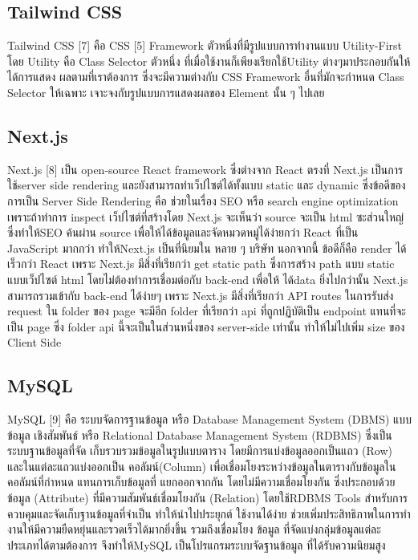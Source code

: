 \subsection{Tailwind CSS}

Tailwind CSS [7] คือ CSS [5] Framework ตัวหนึ่งที่มีรูปแบบการทํางานแบบ Utility-First โดย
Utility คือ Class Selector ตัวหนึ่ง ที่เมื่อใช้งานก็เพียงเรียกใช้Utility ต่างๆมาประกอบกันให้ได้การแสดง
ผลตามที่เราต้องการ ซึ่งจะมีความต่างกับ CSS Framework อื่นที่มักจะกําหนด Class Selector ให้เฉพาะ
เจาะจงกับรูปแบบการแสดงผลของ Element นั้น ๆ ไปเลย
\subsection{Next.js}

Next.js [8] เป็น open-source React framework ซึ่งต่างจาก React ตรงที่ Next.js เป็นการใช้server
side rendering และยังสามารถทําเว็ปไซต์ได้ทั้งแบบ static และ dynamic ซึ่งข้อดีของการเป็น Server
Side Rendering คือ ช่วยในเรื่อง SEO หรือ search engine optimization เพราะถ้าทําการ inspect
เว็ปไซต์ที่สร้างโดย Next.js จะเห็นว่า source จะเป็น html ซะส่วนใหญ่ ซึ่งทําให้SEO ค้นผ่าน source
เพื่อให้ได้ข้อมูลและจัดหมวดหมู่ได้ง่ายกว่า React ที่เป็น JavaScript มากกว่า ทําให้Next.js เป็นที่นิยมใน
หลาย ๆ บริษัท นอกจากนี้ ข้อดีก็คือ render ได้เร็วกว่า React เพราะ Next.js มีสิ่งที่เรียกว่า get static
path ซึ่งการสร้าง path แบบ static แบบเว็ปไซต์ html โดยไม่ต้องทําการเชื่อมต่อกับ back-end เพื่อให้
ได้data ยิ่งไปกว่านั้น Next.js สามารถรวมเข้ากับ back-end ได้ง่ายๆ เพราะ Next.js มีสิ่งที่เรียกว่า API
routes ในการรับส่ง request ใน folder ของ page จะมีอีก folder ที่เรียกว่า api ที่ถูกปฏิบัติเป็น endpoint
แทนที่จะเป็น page ซึ่ง folder api นี้จะเป็นในส่วนหนึ่งของ server-side เท่านั้น ทําให้ไม่ไปเพิ่ม size ของ
Client Side
\subsection{MySQL}

MySQL [9] คือ ระบบจัดการฐานข้อมูล หรือ Database Management System (DBMS) แบบข้อมูล
เชิงสัมพันธ์ หรือ Relational Database Management System (RDBMS) ซึ่งเป็นระบบฐานข้อมูลที่จัด
เก็บรวบรวมข้อมูลในรูปแบบตาราง โดยมีการแบ่งข้อมูลออกเป็นแถว (Row) และในแต่ละแถวแบ่งออกเป็น
คอลัมน์(Column) เพื่อเชื่อมโยงระหว่างข้อมูลในตารางกับข้อมูลในคอลัมน์ที่กําหนด แทนการเก็บข้อมูลที่
แยกออกจากกัน โดยไม่มีความเชื่อมโยงกัน ซึ่งประกอบด้วยข้อมูล (Attribute) ที่มีความสัมพันธ์เชื่อมโยงกัน
(Relation) โดยใช้RDBMS Tools สําหรับการควบคุมและจัดเก็บฐานข้อมูลที่จําเป็น ทําให้นําไปประยุกต์
ใช้งานได้ง่าย ช่วยเพิ่มประสิทธิภาพในการทํางานให้มีความยืดหยุ่นและรวดเร็วได้มากยิ่งขึ้น รวมถึงเชื่อมโยง
ข้อมูล ที่จัดแบ่งกลุ่มข้อมูลแต่ละประเภทได้ตามต้องการ จึงทําให้MySQL เป็นโปรแกรมระบบจัดฐานข้อมูล
ที่ได้รับความนิยมสูง
